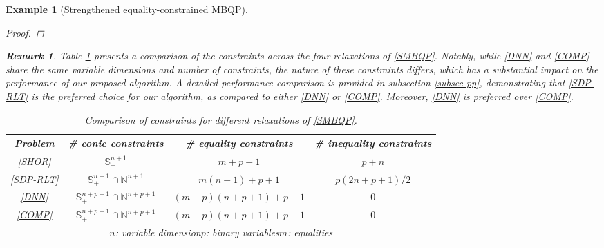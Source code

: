 \documentclass[11pt]{article}
\theoremstyle{plain}
\newtheorem{remark}{Remark}
\newtheorem{example}{Example}
\def\bN{\mathbb{N}}
\def\S{\mathbb{S}}
\begin{document}
\begin{example}[Strengthened equality-constrained MBQP]
\begin{proof}
\end{proof}
\begin{remark}
Table \ref{tab-comparison-SMBQP} presents a comparison of the constraints across the four relaxations of \eqref{SMBQP}. Notably, while \eqref{DNN} and \eqref{COMP} share the same variable dimensions and number of constraints, the nature of these constraints differs, which has a substantial impact on the performance of our proposed algorithm. A detailed performance comparison is provided in subsection \ref{subsec-pp}, demonstrating that \eqref{SDP-RLT} is the preferred choice for our algorithm, as compared to either \eqref{DNN} or \eqref{COMP}. Moreover, \eqref{DNN} is preferred over \eqref{COMP}.
\end{remark}




\begin{center}
\begin{table}[h!]
\begin{center}
    \def\arraystretch{1.5}
    \begin{tabular}{|c|c|c|c|} 
     \hline
    \multicolumn{1}{|c|}{Problem} & \# conic constraints  & \# equality constraints & \# inequality constraints   \\ 
     \hline
     \eqref{SHOR}  & $\S_+^{n+1}$   &   $m+p+1$ & $p+n$ \\ 
     \hline
     \eqref{SDP-RLT}  & $\S_+^{n+1}\cap\bN^{n+1}$   &   $m(n+1)+p+1$ & ${p(2n+p+1)}/{2}$ \\ 
     \hline
     \eqref{DNN} & $\S_+^{n+p+1}\cap\bN^{n+p+1}$  &  $(m+p)(n+p+1)+p+1$ &  $0$ \\ 
     \hline
     \eqref{COMP} & $\S_+^{n+p+1}\cap\bN^{n+p+1}$  &  $(m+p)(n+p+1)+p+1$ &  $0$  \\ 
     \hline    
      \multicolumn{4}{|c|}{$n$: variable dimension\quad $p$: binary variables\quad $m$: equalities}\\
      \hline
     \end{tabular}
    \caption{Comparison of constraints for different relaxations of \eqref{SMBQP}.}
    \label{tab-comparison-SMBQP}
\end{center}
\end{table}
\end{center}

\end{example}
\end{document}
